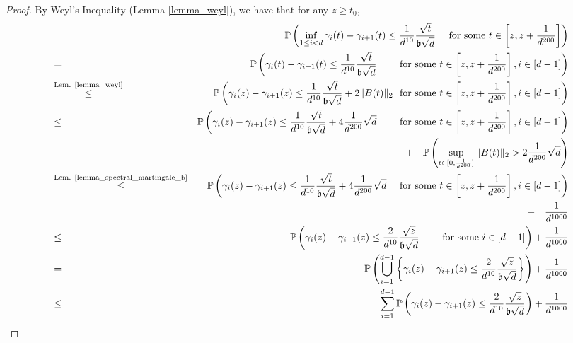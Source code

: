 \documentclass[11pt,letterpaper]{article}
\begin{document}
\begin{proof}
By Weyl's Inequality (Lemma \ref{lemma_weyl}), we have that for any $z \geq t_0$,
%
\begin{eqnarray}
& &\!\!\!\!\!\!\!\!\!\!  \!\!\! \!\!\!\!\!\!\!\!\!\!\!\!\!\!\!\!\!\! \mathbb{P}\left( \inf_{1\leq i < d } \gamma_i(t) - \gamma_{i+1}(t) \leq \frac{1}{d^{10}} \frac{\sqrt{t}}{\mathfrak{b}\sqrt{d}}   \quad \textrm{ for some }  t \in \left[z, z + \frac{1}{d^{200}}\right] \right) \nonumber\\
%
&=& \mathbb{P}\left( \gamma_i(t) - \gamma_{i+1}(t) \leq \frac{1}{d^{10}} \frac{\sqrt{t}}{\mathfrak{b}\sqrt{d}}   \qquad \textrm{ for some }  t \in \left[z, z + \frac{1}{d^{200}}\right], i \in[d-1] \right) \nonumber\\
 & \stackrel{\textrm{Lem. \ref{lemma_weyl}}}{\leq}& \mathbb{P}\left( \gamma_i(z) - \gamma_{i+1}(z) \leq \frac{1}{d^{10}} \frac{\sqrt{t}}{\mathfrak{b}\sqrt{d}} +  2 \|B(t)\|_2   \, \, \textrm{ for some }  t \in \left[z, z + \frac{1}{d^{200}}\right], i \in[d-1] \right) \nonumber\\
  &\leq &\mathbb{P}\left( \gamma_i(z) - \gamma_{i+1}(z) \leq \frac{1}{d^{10}} \frac{\sqrt{t}}{\mathfrak{b}\sqrt{d}} +  4 \frac{1}{d^{200}} \sqrt{d}   \qquad \textrm{ for some }  t \in \left[z, z + \frac{1}{d^{200}}\right], i \in[d-1]  \right)\nonumber\\
   & & + \quad  \mathbb{P}\left(\sup_{t \in [0, \frac{1}{d^{200}}]} \|B(t)\|_2  > 2 \frac{1}{d^{200}} \sqrt{d} \right)\nonumber\\
   &  \stackrel{\textrm{Lem.  \ref{lemma_spectral_martingale_b}}}{\leq}&  \mathbb{P}\left( \gamma_i(z) - \gamma_{i+1}(z) \leq \frac{1}{d^{10}} \frac{\sqrt{t}}{\mathfrak{b}\sqrt{d}} +  4 \frac{1}{d^{200}} \sqrt{d}     \quad \textrm{ for some }   t \in \left[z, z + \frac{1}{d^{200}}\right], i \in[d-1]   \right) \nonumber\\
   & & + \quad  \frac{1}{d^{1000}} \label{eq_n174}\\
   & \leq & \mathbb{P}\left( \gamma_i(z) - \gamma_{i+1}(z) \leq \frac{2}{d^{10}} \frac{\sqrt{z}}{\mathfrak{b}\sqrt{d}}       \qquad \textrm{ for some }     i \in[d-1]    \right)+  \frac{1}{d^{1000}}\nonumber\\
    & =  & \mathbb{P} \left(\bigcup_{i=1}^{d-1} \left\{ \gamma_i(z) - \gamma_{i+1}(z) \leq \frac{2}{d^{10}} \frac{\sqrt{z}}{\mathfrak{b}\sqrt{d}} \right\}  \right)+  \frac{1}{d^{1000}}\nonumber\\
      & \leq & \sum_{i=1}^{d-1} \mathbb{P}\left( \gamma_i(z) - \gamma_{i+1}(z) \leq \frac{2}{d^{10}} \frac{\sqrt{z}}{\mathfrak{b}\sqrt{d}}   \right)+  \frac{1}{d^{1000}}\label{eq_n175}\\

\end{eqnarray}
\end{proof}
\end{document}
